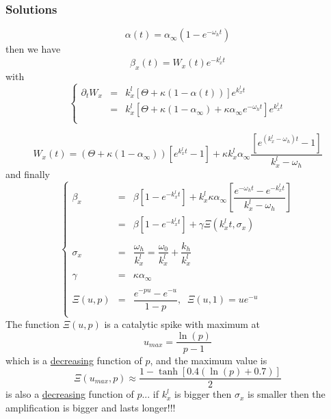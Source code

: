 \documentclass[aps,onecolumn,12pt]{revtex4}
\begin{document}
\subsubsection{Solutions}

\begin{equation}
	\alpha(t) = \alpha_\infty \left(1-e^{-\omega_ht}\right)
\end{equation}
then we have
\begin{equation}
	\beta_x(t) = W_x(t) e^{-k_x^l t }
\end{equation}
with
\begin{equation}
\left \lbrace
\begin{array}{rcl}
	\partial_tW_x & = & k_x^l \left[ \Theta + \kappa(1-\alpha(t)) \right] e^{k_x^lt} \\
	& = & k_x^l \left[ \Theta + \kappa(1-\alpha_\infty) + \kappa\alpha_\infty e^{-\omega_h t} \right] e^{k_x^lt} \\
\end{array}
\right.
\end{equation}
	
\begin{equation}
		W_x(t) = \left(\Theta+\kappa(1-\alpha_\infty)\right) \left[e^{k_x^l t}-1\right]
		+ \kappa k_x^l \alpha_\infty \dfrac{\left[e^{\left(k_x^l-\omega_h\right) t}-1\right]}{k_x^l-\omega_h}
\end{equation}	
and finally
\begin{equation}
\left\lbrace
\begin{array}{rcl}
	\beta_x & = & \beta \left[1-e^{-k_x^l t}\right] 
	+ k_x^l \kappa \alpha_\infty
	\left[
	 \dfrac{
	 e^{-\omega_h t} - e^{-k_x^l t}
	 }
	 {k_x^l-\omega_h}
	 \right]\\
	 & = & \beta \left[1-e^{-k_x^l t}\right] + \gamma \Xi\left(k_x^lt,\sigma_x\right)\\
	 \\
	 \sigma_x & = & \dfrac{\omega_h}{k_x^l} = \dfrac{\omega_0}{k_x^l} + \dfrac{k_h}{k_x^l} \\
	 \\
	 \gamma & = & \kappa \alpha_\infty \\
	 \\
	 \Xi\left(u,p\right) & = & \dfrac{e^{-pu}-e^{-u}}{1-p},\;\;\Xi(u,1)=ue^{-u}\\
\end{array}
\right.
\end{equation}
The function $\Xi\left(u,p\right)$ is a catalytic spike with maximum at 
\begin{equation}
	u_{max} = \dfrac{\ln(p)}{p-1}
\end{equation}
which is a \underline{decreasing} function of $p$, and the maximum value is
\begin{equation}
	\Xi\left(u_{max},p\right) \approx \dfrac{1-\tanh\left[ 0.4(\ln(p)+0.7)\right]}{2}
\end{equation}
is also a \underline{decreasing} function of $p$...
if $k_x^l$ is bigger then $\sigma_x$ is smaller then the amplification is bigger and lasts longer!!!
\end{document}
